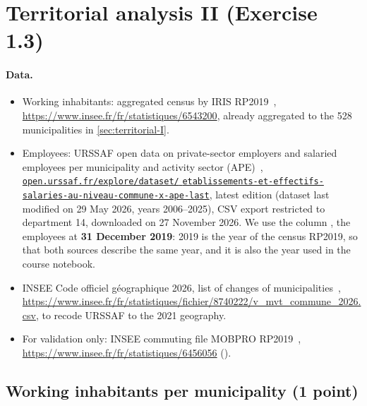 \section{Territorial analysis II (Exercise 1.3)}\label{sec:territorial-II}

\paragraph{Data.}
\begin{itemize}
  \item Working inhabitants: aggregated census by IRIS RP2019~\cite{insee-census-aggregated},
  \url{https://www.insee.fr/fr/statistiques/6543200}, already aggregated to the 528 municipalities in
  \cref{sec:territorial-I}.
  \item Employees: URSSAF open data on private-sector employers and salaried employees per municipality and activity
  sector (APE)~\cite{urssaf-employment},\newline
  \href{https://open.urssaf.fr/explore/dataset/etablissements-et-effectifs-salaries-au-niveau-commune-x-ape-last/information/}{\texttt{open.urssaf.fr/explore/dataset/}\newline
  \texttt{etablissements-et-effectifs-salaries-au-niveau-commune-x-ape-last}},
  latest edition (dataset last modified on 29 May 2026, years 2006--2025), CSV export restricted to department 14,
  downloaded on 27 November 2026. We use the column , the employees at
  \textbf{31 December 2019}: 2019 is the year of the census RP2019, so that both sources describe the same year, and it
  is also the year used in the course notebook.
  \item INSEE Code officiel g\'eographique 2026, list of changes of municipalities~\cite{insee-cog-2026},
  \url{https://www.insee.fr/fr/statistiques/fichier/8740222/v_mvt_commune_2026.csv}, to recode URSSAF to the 2021
  geography.
  \item For validation only: INSEE commuting file MOBPRO RP2019~\cite{insee-mobpro-2019},
  \url{https://www.insee.fr/fr/statistiques/6456056} ().
\end{itemize}

\subsection{Working inhabitants per municipality (1 point)}

